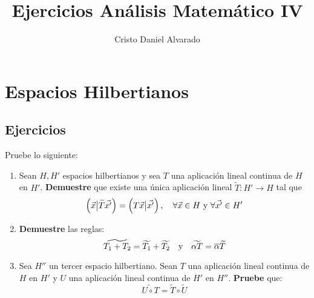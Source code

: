 \documentclass[12pt]{report}
\theoremstyle{largebreak}
\newcommand\cf[3]{\ensuremath{#1:#2\rightarrow#3}}
\newcommand\adj[1]{\ensuremath{\widetilde{#1}}}
\newcommand\pint[2]{\ensuremath{\left(#1\big|#2\right)}}
\newcommand\conj[1]{\ensuremath{\overline{#1}}}
\begin{document}
    \title{Ejercicios Análisis Matemático IV}
    \author{Cristo Daniel Alvarado}
    \maketitle

    \tableofcontents %

    \chapter{Espacios Hilbertianos}

    \section{Ejercicios}

    \renewcommand{\theenumi}{\roman{enumi}}

    \begin{excer}
        Pruebe lo siguiente:
        \begin{enumerate}
            \item Sean $H,H'$ espacios hilbertianos y sea $T$ una aplicación lineal continua de $H$ en $H'$. \textbf{Demuestre} que existe una única aplicación lineal $\cf{\adj{T}}{H'}{H}$ tal que
            \begin{equation*}
                \pint{\vec{x}}{\adj{T}\vec{x'}}=\pint{T\vec{x}}{\vec{x'}},\quad\forall\vec{x}\in H\textup{ y }\forall\vec{x'}\in H'
            \end{equation*}
            \item \textbf{Demuestre} las reglas:
            \begin{equation*}
                \adj{T_1+T_2}=\adj{T_1}+\adj{T_2}\quad\textup{y}\quad\adj{\alpha T}=\conj{\alpha}\adj{T}
            \end{equation*}
            \item Sea $H''$ un tercer espacio hilbertiano. Sean $T$ una aplicación lineal continua de $H$ en $H'$ y $U$ una aplicación lineal continua de $H'$ en $H''$. \textbf{Pruebe} que:
            \begin{equation*}
                \adj{U\circ T}=\adj{T}\circ\adj{U}
            \end{equation*}
        \end{enumerate}
    \end{excer}
\end{document}
